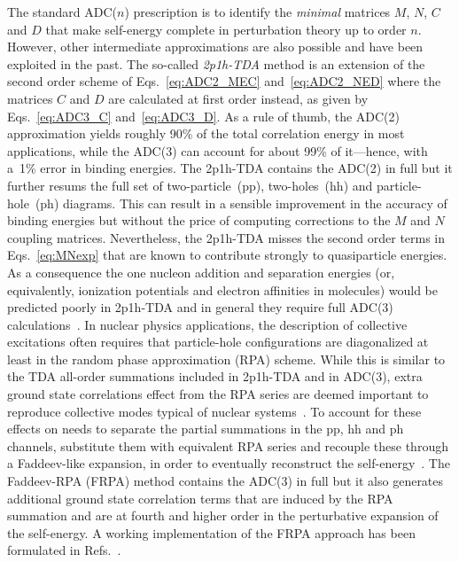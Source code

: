 The standard ADC($n$) prescription is to identify the {\em minimal} matrices  $M$, $N$, $C$ and $D$   that make self-energy  complete in
perturbation theory up to order $n$. However, other intermediate approximations are also possible and have been exploited in the past.
%
The so-called \hbox{\em 2p1h-TDA} method is an extension of the second order scheme of Eqs.~\eqref{eq:ADC2_MEC} and~\eqref{eq:ADC2_NED}  where the matrices $C$ and $D$ are  calculated at first order instead, as given by  Eqs.~\eqref{eq:ADC3_C} and~\eqref{eq:ADC3_D}. As a rule of thumb, the ADC(2)  approximation yields roughly 90\% of the total correlation energy in most applications, while the ADC(3) can account for about 99\% of it---hence, with a~1\% error in binding energies. The 2p1h-TDA  contains the ADC(2) in full but it further resums the full set of two-particle~(pp), two-holes~(hh) and particle-hole~(ph) diagrams. This can result in a sensible improvement in the accuracy of binding energies but without the price of computing corrections to the $M$ and $N$ coupling matrices. Nevertheless, the 2p1h-TDA misses the second order terms in Eqs.~\eqref{eq:MNexp} that are known to contribute strongly to quasiparticle energies. As a consequence the one nucleon addition and separation energies (or, equivalently, ionization potentials and electron affinities in molecules) would be predicted poorly in 2p1h-TDA and in general they require full ADC(3) calculations~\cite{ch11_VonNiessen1984ConPhysRep}.
%
%
In nuclear physics applications, the description of collective excitations often requires that  particle-hole configurations are diagonalized at least in the random phase approximation (RPA) scheme. While this is similar to the TDA all-order summations included in 2p1h-TDA and in ADC(3), extra ground state correlations effect from the RPA series are deemed important to reproduce collective modes typical of nuclear systems~\cite{ch11_RingSchuck}.
%
To account for these effects on needs to separate the partial summations in the pp, hh and ph channels, substitute them with equivalent RPA series and  recouple these through a Faddeev-like expansion, in order to eventually reconstruct the self-energy~\cite{ch11_Danielewicz1994OMP,ch11_Barbieri2001frpa}.
The Faddeev-RPA (FRPA)  method contains the ADC(3) in full but it also generates additional ground state correlation terms that are induced by the RPA summation and are at fourth and higher order in the perturbative expansion of the self-energy. A working implementation of the FRPA approach has been formulated in Refs.~\cite{ch11_Barbieri2001frpa,ch11_Barbieri2007Atoms,ch11_Degroote2011frpa}.


